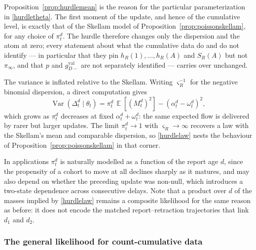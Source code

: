 \documentclass{article}
\theoremstyle{definition}
\theoremstyle{remark}
\newcommand{\E}{\operatorname{\mathbb{E}}}
\newcommand{\Var}{\operatorname{Var}}
\begin{document}
Proposition~\ref{prop:hurdlemean} is the reason for the particular
parameterization in \eqref{hurdletheta}. The first moment of the update, and
hence of the cumulative level, is exactly that of the Skellam model of
Proposition~\ref{prop:poissonskellam}, for any choice of $\pi_t^d$. The hurdle
therefore changes only the dispersion and the atom at zero; every statement about
what the cumulative data do and do not identify --- in particular that they pin
$h_R(1),\dots,h_R(A)$ and $S_R(A)$ but not $\pi_\infty$, and that $p$ and
$g_{D-}^{\mathrm{val}}$ are not separately identified --- carries over unchanged.

The variance is inflated relative to the Skellam. Writing
$\varsigma_R^{-1}$ for the negative binomial dispersion, a direct computation
gives
\begin{equation}\label{hurdlevar}
    \Var(\Delta_t^d\mid\theta_t)
    =
    \pi_t^d\,\E\left[(M_t^d)^2\right]
    -
    \left(\alpha_t^d-\omega_t^d\right)^2,
\end{equation}
which grows as $\pi_t^d$ decreases at fixed $\alpha_t^d+\omega_t^d$: the same
expected flow is delivered by rarer but larger updates. The limit
$\pi_t^d\to1$ with $\varsigma_R\to\infty$ recovers a law with the Skellam's mean
and comparable dispersion, so \eqref{hurdlelaw} nests the behaviour of
Proposition~\ref{prop:poissonskellam} in that corner.

In applications $\pi_t^d$ is naturally modelled as a function of the report age
$d$, since the propensity of a cohort to move at all declines sharply as it
matures, and may also depend on whether the preceding update was non-null, which
introduces a two-state dependence across consecutive delays. Note that a product
over $d$ of the masses implied by \eqref{hurdlelaw} remains a composite
likelihood for the same reason as before: it does not encode the matched
report--retraction trajectories that link $d_1$ and $d_2$.

\subsubsection{The general likelihood for count-cumulative data}
\end{document}
